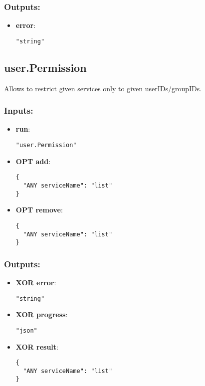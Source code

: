 \subsubsection*{Outputs:}
\begin{itemize}
    \item \textbf{error}: 
\begin{lstlisting}
"string"
\end{lstlisting}
  \end{itemize}

\subsection{user.Permission}
Allows to restrict given services only to given userIDs/groupIDs.
\subsubsection*{Inputs:}
\begin{itemize}
    \item \textbf{run}: 
\begin{lstlisting}
"user.Permission"
\end{lstlisting}
    \item \textbf{OPT add}: 
\begin{lstlisting}
{
  "ANY serviceName": "list"
}
\end{lstlisting}
    \item \textbf{OPT remove}: 
\begin{lstlisting}
{
  "ANY serviceName": "list"
}
\end{lstlisting}
  \end{itemize}

\subsubsection*{Outputs:}
\begin{itemize}
    \item \textbf{XOR error}: 
\begin{lstlisting}
"string"
\end{lstlisting}
    \item \textbf{XOR progress}: 
\begin{lstlisting}
"json"
\end{lstlisting}
    \item \textbf{XOR result}: 
\begin{lstlisting}
{
  "ANY serviceName": "list"
}
\end{lstlisting}
  \end{itemize}

